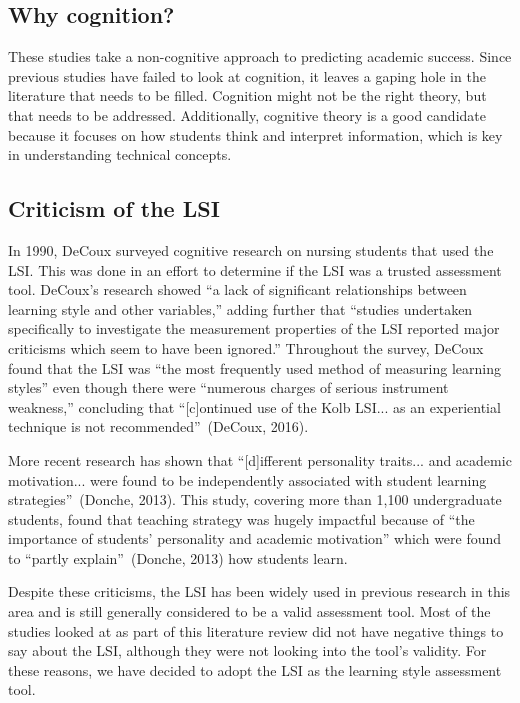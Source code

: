 \subsection{Why cognition?}
These studies take a non-cognitive approach to predicting academic success. Since previous studies have failed to look at cognition, it leaves a gaping hole in the literature that needs to be filled. Cognition might not be the right theory, but that needs to be addressed. Additionally, cognitive theory is a good candidate because it focuses on how students think and interpret information, which is key in understanding technical concepts.

\subsection{Criticism of the LSI}
In 1990, DeCoux surveyed cognitive research on nursing students that used the LSI. This was done in an effort to determine if the LSI was a trusted assessment tool. DeCoux's research showed ``a lack of significant relationships between learning style and other variables,'' adding further that ``studies undertaken specifically to investigate the measurement properties of the LSI reported major criticisms which seem to have been ignored.'' Throughout the survey, DeCoux found that the LSI was ``the most frequently used method of measuring learning styles'' even though there were ``numerous charges of serious instrument weakness,'' concluding that ``[c]ontinued use of the Kolb LSI... as an experiential technique is not recommended''~(DeCoux, 2016).

More recent research has shown that ``[d]ifferent personality traits... and academic motivation... were found to be independently associated with student learning strategies''~(Donche, 2013). This study, covering more than 1,100 undergraduate students, found that teaching strategy was hugely impactful because of ``the importance of students' personality and academic motivation'' which were found to ``partly explain''~(Donche, 2013) how students learn.

Despite these criticisms, the LSI has been widely used in previous research in this area and is still generally considered to be a valid assessment tool. Most of the studies looked at as part of this literature review did not have negative things to say about the LSI, although they were not looking into the tool's validity. For these reasons, we have decided to adopt the LSI as the learning style assessment tool.


